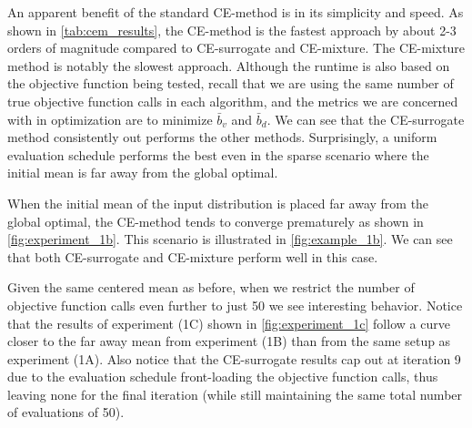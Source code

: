 An apparent benefit of the standard CE-method is in its simplicity and speed.
As shown in \cref{tab:cem_results}, the CE-method is the fastest approach by about 2-3 orders of magnitude compared to CE-surrogate and CE-mixture.
The CE-mixture method is notably the slowest approach.
Although the runtime is also based on the objective function being tested, recall that we are using the same number of true objective function calls in each algorithm, and the metrics we are concerned with in optimization are to minimize $\bar{b}_v$ and $\bar{b}_d$.
We can see that the CE-surrogate method consistently out performs the other methods.
Surprisingly, a uniform evaluation schedule performs the best even in the sparse scenario where the initial mean is far away from the global optimal.


When the initial mean of the input distribution is placed far away from the global optimal, the CE-method tends to converge prematurely as shown in \cref{fig:experiment_1b}.
This scenario is illustrated in \cref{fig:example_1b}.
We can see that both CE-surrogate and CE-mixture perform well in this case.


Given the same centered mean as before, when we restrict the number of objective function calls even further to just 50 we see interesting behavior.
Notice that the results of experiment (1C) shown in \cref{fig:experiment_1c} follow a curve closer to the far away mean from experiment (1B) than from the same setup as experiment (1A). Also notice that the CE-surrogate results cap out at iteration 9 due to the evaluation schedule front-loading the objective function calls, thus leaving none for the final iteration (while still maintaining the same total number of evaluations of 50).

